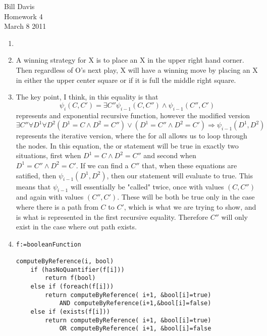 \documentclass[11pt,fleqn]{article}
\begin{document}
\newcommand{\mbf}[1]{\mbox{{\bfseries #1}}}
\newcommand{\N}{\mbf{N}}
\renewcommand{\O}{\mbf{O}}

\noindent Bill Davis \\
Homework 4 \\
March 8 2011

\begin{enumerate}

\item

\item
A winning strategy for X is to place an X in the upper right hand corner. Then regardless of O's next play, X will have a winning move by placing an X in either the upper center square or if it is full the middle right square. 

\item
The key point, I think, in this equality is that 
\[
\psi_i(C,C') = \exists C''\psi_{i-1}(C,C'') \land \psi_{i-1}(C'',C')
\]
represents and exponential recursive function, however the modified version 
\[
\exists C'' \forall D^1 \forall D^2 (D^1=C \land D^2 = C'') \lor (D^1=C'' \land D^2 = C') \Rightarrow \psi_{i-1}(D^1,D^2)
\]
represents the iterative version, where the for all allows us to loop through the nodes. In this equation, the or statement will be true in exactly two situations, first when $D^1=C \land D^2=C''$ and second when $D^1=C'' \land D^2 = C'$. If we can find a $C''$ that, when these equations are satified, then $\psi_{i-1}(D^1,D^2)$, then our statement will evaluate to true. This means that $\psi_{i-1}$ will essentially be "called" twice, once with values $(C,C'')$ and again with values $(C'',C')$. These will be both be true only in the case where there is a path from $C$ to $C'$, which is what we are trying to show, and is what is represented in the first recursive equality. Therefore $C''$ will only exist in the case where out path exists. 

\item

\begin{verbatim}
f:=booleanFunction

computeByReference(i, bool)
    if (hasNoQuantifier(f[i]))
        return f(bool)
    else if (foreach(f[i]))
        return computeByReference( i+1, &bool[i]=true) 
            AND computeByReference(i+1,&bool[i]=false)
    else if (exists(f[i]))
        return computeByReference( i+1, &bool[i]=true)
            OR computeByReference( i+1, &bool[i]=false 

\end{verbatim}


\end{enumerate}
\end{document}
